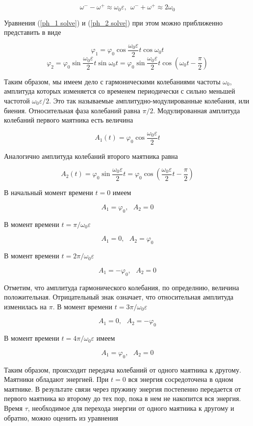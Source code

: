 \documentclass[14pt]{article}
\begin{document}
$$\omega^- - \omega^+ \approx \omega_0\varepsilon, ~~\omega^- + \omega^+ \approx 2\omega_0$$

Уравнения (\ref{ph_1 solve}) и (\ref{ph_2 solve}) при этом можно приближенно представить в виде

\begin{equation}
\varphi_1 = \varphi_0\cos\frac{\omega_0\varepsilon}{2}t \cos\omega_0t
\end{equation}
\begin{equation}
\varphi_2 = \varphi_0\sin\frac{\omega_0\varepsilon}{2}t \sin\omega_0t = 
\varphi_0\sin\frac{\omega_0\varepsilon}{2}t \cos(\omega_0t - \frac{\pi}{2})
\end{equation}

\noindent Таким образом, мы имеем дело с гармоническими колебаниями частоты $\omega_0$, амплитуда которых изменяется со временем периодически с сильно меньшей частотой $\omega_0\varepsilon/2$. Это так называемые амплитудно-модулированные колебания, или биения. Относительная фаза колебаний равна $\pi/2$. Модулированная амплитуда колебаний первого маятника есть величина

$$A_1(t) = \varphi_0\cos\frac{\omega_0\varepsilon}{2}t$$

\noindent Аналогично амплитуда колебаний второго маятника равна

$$A_2(t) = \varphi_0\sin\frac{\omega_0\varepsilon}{2}t = \varphi_0\cos(\frac{\omega_0\varepsilon}{2}t - \frac{\pi}{2})$$

\noindent В начальный момент времени $t = 0$ имеем

$$A_1 = \varphi_0, ~~~A_2 = 0$$

\noindent В момент времени $t = \pi/\omega_0\varepsilon$

$$A_1 = 0, ~~~A_2 = \varphi_0$$

\noindent В момент времени $t = 2\pi/\omega_0\varepsilon$

$$A_1 = -\varphi_0, ~~~A_2 = 0$$

\noindent Отметим, что амплитуда гармонического колебания, по определнию, величина положительная. Отрицательный знак означает, что относительная амплитуда изменилась на $\pi$. В момент времени $t = 3\pi/\omega_0\varepsilon$

$$A_1 = 0, ~~~A_2 = -\varphi_0$$

\noindent В момент времени $t = 4\pi/\omega_0\varepsilon$ имеем

$$A_1 = \varphi_0, ~~~A_2 = 0$$

Таким образом, происходит передача колебаний от одного маятника к другому. Маятники обладают энергией. При $t = 0$ вся энергия сосредоточена в одном маятнике. В результате связи через пружину энергия постепенно передается от первого маятника ко второму до тех пор, пока в нем не накопится вся энергия. Время $\tau$, необходимое для перехода энергии от одного маятника к другому и обратно, можно оценить из уравнения
\end{document}
